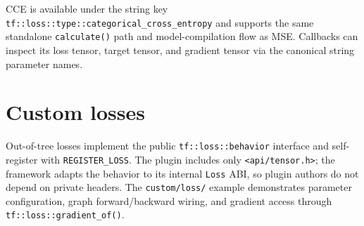 CCE is available under the string key
\texttt{tf::loss::type::categorical\_cross\_entropy} and supports the same
standalone \texttt{calculate()} path and model-compilation flow as MSE.
Callbacks can inspect its loss tensor, target tensor, and gradient tensor via
the canonical string parameter names.

\section{Custom losses}

Out-of-tree losses implement the public \texttt{tf::loss::behavior} interface
and self-register with \texttt{REGISTER\_LOSS}. The plugin includes only
\texttt{<api/tensor.h>}; the framework adapts the behavior to its internal
\texttt{Loss} ABI, so plugin authors do not depend on private headers. The
\texttt{custom/loss/} example demonstrates parameter configuration, graph
forward/backward wiring, and gradient access through
\texttt{tf::loss::gradient\_of()}.

